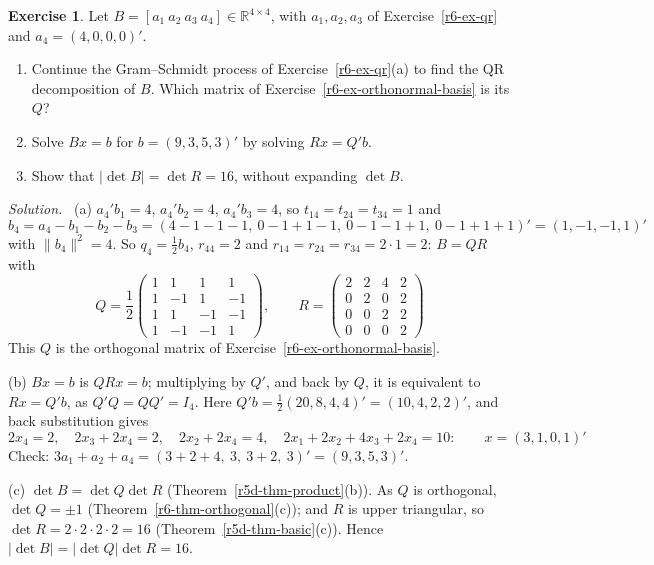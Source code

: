 \documentclass[12pt]{article}
\newcommand{\R}{\mathbb R}
\theoremstyle{definition}
\newtheorem{exercise}{Exercise}
\newenvironment{solution}{\par\noindent\textit{Solution.}\ }{\par\smallskip}
\begin{document}
\begin{exercise}\label{r6-ex-qr-solve}
Let \(B=[a_1\ a_2\ a_3\ a_4]\in\R^{4\times4}\), with \(a_1,a_2,a_3\) of Exercise~\ref{r6-ex-qr} and
\(a_4=(4,0,0,0)'\).
\begin{enumerate}
\item Continue the Gram--Schmidt process of Exercise~\ref{r6-ex-qr}(a) to find the QR decomposition of \(B\).
Which matrix of Exercise~\ref{r6-ex-orthonormal-basis} is its \(Q\)?
\item Solve \(Bx=b\) for \(b=(9,3,5,3)'\) by solving \(Rx=Q'b\).
\item Show that \(\lvert\det B\rvert=\det R=16\), without expanding \(\det B\).
\end{enumerate}
\end{exercise}
\begin{solution}
(a) \(a_4'b_1=4\), \(a_4'b_2=4\), \(a_4'b_3=4\), so \(t_{14}=t_{24}=t_{34}=1\) and
\[
b_4=a_4-b_1-b_2-b_3=(4-1-1-1,\ 0-1+1-1,\ 0-1-1+1,\ 0-1+1+1)'=(1,-1,-1,1)'
\]
with \(\lVert b_4\rVert^2=4\). So \(q_4=\frac12b_4\), \(r_{44}=2\) and \(r_{14}=r_{24}=r_{34}=2\cdot1=2\): \(B=QR\) with
\[
Q=\frac12\begin{pmatrix}1&1&1&1\\1&-1&1&-1\\1&1&-1&-1\\1&-1&-1&1\end{pmatrix},\qquad
R=\begin{pmatrix}2&2&4&2\\0&2&0&2\\0&0&2&2\\0&0&0&2\end{pmatrix}
\]
This \(Q\) is the orthogonal matrix of Exercise~\ref{r6-ex-orthonormal-basis}.

(b) \(Bx=b\) is \(QRx=b\); multiplying by \(Q'\), and back by \(Q\), it is equivalent to \(Rx=Q'b\), as \(Q'Q=QQ'=I_4\).
Here \(Q'b=\frac12(20,8,4,4)'=(10,4,2,2)'\), and back substitution gives
\[
2x_4=2,\quad 2x_3+2x_4=2,\quad 2x_2+2x_4=4,\quad 2x_1+2x_2+4x_3+2x_4=10:\qquad x=(3,1,0,1)'
\]
Check: \(3a_1+a_2+a_4=(3+2+4,\ 3,\ 3+2,\ 3)'=(9,3,5,3)'\).

(c) \(\det B=\det Q\det R\) (Theorem~\ref{r5d-thm-product}(b)). As \(Q\) is orthogonal, \(\det Q=\pm1\)
(Theorem~\ref{r6-thm-orthogonal}(c)); and \(R\) is upper triangular, so \(\det R=2\cdot2\cdot2\cdot2=16\)
(Theorem~\ref{r5d-thm-basic}(c)). Hence \(\lvert\det B\rvert=\lvert\det Q\rvert\det R=16\).
\end{solution}
\end{document}
